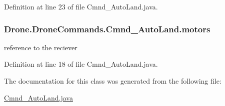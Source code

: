 Definition at line 23 of file Cmnd\+\_\+\+Auto\+Land.\+java.

\hypertarget{class_drone_1_1_drone_commands_1_1_cmnd___auto_land_a7694502dadfec8e051a5cbc3cb868883}{}
\subsubsection[{motors}]{ Drone.\+Drone\+Commands.\+Cmnd\+\_\+\+Auto\+Land.\+motors\hspace{0.3cm}{\ttfamily [private]}}\label{class_drone_1_1_drone_commands_1_1_cmnd___auto_land_a7694502dadfec8e051a5cbc3cb868883}
reference to the reciever 

Definition at line 18 of file Cmnd\+\_\+\+Auto\+Land.\+java.



The documentation for this class was generated from the following file\+:\begin{DoxyCompactItemize}
\item 
\hyperlink{_cmnd___auto_land_8java}{Cmnd\+\_\+\+Auto\+Land.\+java}\end{DoxyCompactItemize}
